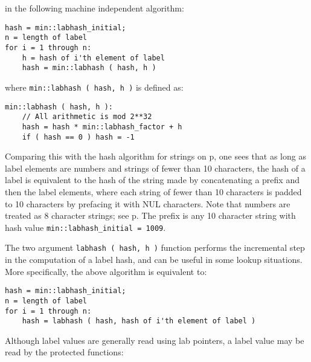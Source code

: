 \documentclass[12pt]{article}
\newcommand{\pagref}[1]{p\pageref{#1}}
\newcommand{\EOL}{\penalty \exhyphenpenalty}
\newenvironment{indpar}[1][0.3in]%
	{\begin{list}{}%
		     {\setlength{\itemsep}{0in}%
		      \setlength{\topsep}{0in}%
		      \setlength{\parsep}{1ex}%
		      \setlength{\labelwidth}{#1}%
		      \setlength{\leftmargin}{#1}%
		      \addtolength{\leftmargin}{\labelsep}}%
	 \item}%
	{\end{list}}
\begin{document}
in the following machine independent algorithm:\label{LABEL-HASH-ALGORITHM}

\begin{indpar}\begin{verbatim}
hash = min::labhash_initial;
n = length of label
for i = 1 through n:
    h = hash of i'th element of label
    hash = min::labhash ( hash, h )
\end{verbatim}\end{indpar}

where {\tt min::labhash ( hash, h )} is defined as:

\begin{indpar}\begin{verbatim}
min::labhash ( hash, h ):
    // All arithmetic is mod 2**32
    hash = hash * min::labhash_factor + h
    if ( hash == 0 ) hash = -1
\end{verbatim}\end{indpar}

Comparing this with the hash algorithm for strings
on \pagref{HASH-ALGORITHM}, one sees that as long as
label elements are numbers and strings of fewer than 10 characters,
the hash of a label is equivalent to the hash of the
string made by concatenating a prefix and then the label elements, where each
string of fewer than 10 characters is padded to 10 characters
by prefacing it with NUL characters.  Note that
numbers are treated as 8 character strings; see
\pagref{NUMBER-HASH-ALGORITHM}.  The prefix is any 10 character string with
hash value {\tt min::\EOL labhash\_\EOL initial = 1009}.

The two argument \verb|labhash ( hash, h )| function performs the
incremental step in the computation of a label hash, and can be useful
in some lookup situations.  More specifically, the above algorithm
is equivalent to:

\begin{indpar}\begin{verbatim}
hash = min::labhash_initial;
n = length of label
for i = 1 through n:
    hash = labhash ( hash, hash of i'th element of label )
\end{verbatim}\end{indpar}

Although label values are generally read using lab pointers,
a label value may be read by the protected functions:
\end{document}
